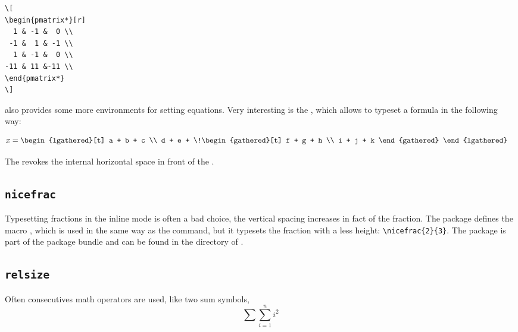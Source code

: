 \begin{table}[htb]
\begin{lstlisting}
\[
\begin{pmatrix*}[r]
  1 & -1 &  0 \\
 -1 &  1 & -1 \\
  1 & -1 &  0 \\
-11 & 11 &-11 \\
\end{pmatrix*}
\]
\end{lstlisting}

 also provides some more environments for setting equations.
Very interesting is the , which allows to typeset a formula in
the following way:

\begin{LTXexample}[width=0.6\linewidth]
\begin{align}
 x &= 
  \begin{lgathered}[t]
    a + b + c \\
    d + e + 
      \!\begin{gathered}[t]
        f + g + h \\
        i + j + k
      \end{gathered}
  \end{lgathered}
\end{align}
\end{LTXexample}

The \CMD{!} revokes the internal horizontal space 
in front of the .



\subsection{\texttt{nicefrac}}\label{sec:nicefrac}
Typesetting fractions in the inline mode is often a bad choice, the vertical spacing
increases in fact of the fraction. The  package defines the macro
, which is used in the same way as the  command, but it
typesets the fraction with a less height:  \lstinline|\nicefrac{2}{3}|. 
The package is part of the  package bundle and can be found in the
directory of . 



\subsection{\texttt{relsize}}\label{sec:relsize}
Often consecutives math operators are used, like two sum symbols, \eg
%
\[  \sum\sum_{i=1}^n i^2 \]



\end{table}
